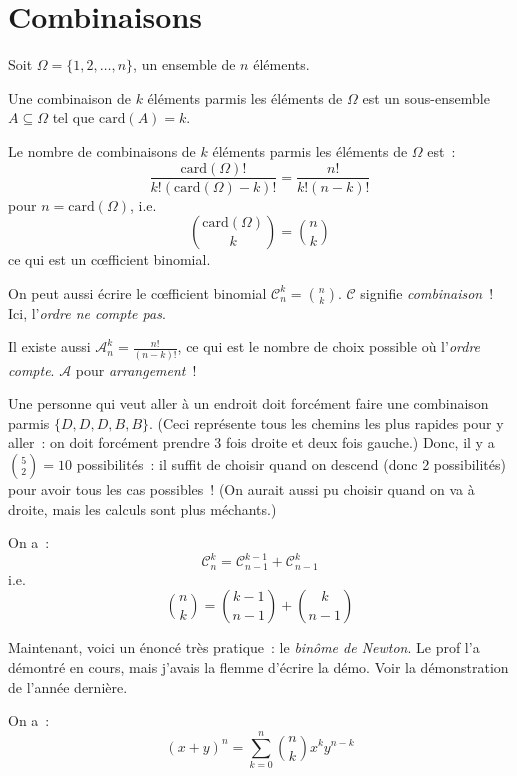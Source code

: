 \documentclass[a4paper, titlepage]{article}
\begin{document}
	\section{Combinaisons}
	Soit $\Omega=\{1,2,\ldots,n\}$, un ensemble de $n$ éléments.

	\begin{defn}
		Une combinaison de $k$ éléments parmis les éléments de $\Omega$ est un sous-ensemble $A\subseteq\Omega$ tel que $\mathrm{card}(A) = k$.
	\end{defn}
	\begin{props}
		Le nombre de combinaisons de $k$ éléments parmis les éléments de $\Omega$ est~:
		$$ \frac{\mathrm{card}(\Omega)!}{k!(\mathrm{card}(\Omega)-k)!} = \frac{n!}{k!(n-k)!} $$
		pour $n = \mathrm{card}(\Omega)$, i.e.
		$$ \binom{\mathrm{card}(\Omega)}{k} = \binom nk $$
		ce qui est un cœfficient binomial.
	\end{props}
	On peut aussi écrire le cœfficient binomial $\mathcal{C}^k_n = \binom nk$. $\mathcal{C}$ signifie \textit{combinaison}~! Ici, l'\textit{ordre ne compte pas}.

	Il existe aussi $\mathcal{A}^k_n = \frac{n!}{(n-k)!}$, ce qui est le nombre de choix possible où l'\textit{ordre compte}. $\mathcal{A}$ pour \textit{arrangement}~!

	\begin{exemple}
		Une personne qui veut aller à un endroit doit forcément faire une combinaison parmis $\{D,D,D,B,B\}$. (Ceci représente tous les chemins les plus rapides pour y aller~: on doit forcément prendre 3 fois droite et deux fois gauche.) Donc, il y a $\binom 52 = 10$ possibilités~: il suffit de choisir quand on descend (donc 2 possibilités) pour avoir tous les cas possibles~! (On aurait aussi pu choisir quand on va à droite, mais les calculs sont plus méchants.)
	\end{exemple}

	\begin{props}
		On a~:
		$$ \mathcal{C}^k_n = \mathcal{C}^{k-1}_{n-1} + \mathcal{C}^k_{n-1} $$
		i.e.
		$$ \binom nk = \binom{k-1}{n-1}+\binom k{n-1} $$
	\end{props}

	Maintenant, voici un énoncé très pratique~: le \textit{binôme de Newton}. Le prof l'a démontré en cours, mais j'avais la flemme d'écrire la démo. Voir la démonstration de l'année dernière.

	\begin{thm}
		On a~:
		$$ (x+y)^n = \sum_{k=0}^{n} \binom nk x^ky^{n-k} $$
	\end{thm}
\end{document}
